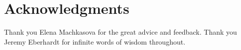 \documentclass{sig-alternate}
\begin{document}


\section*{Acknowledgments}
\label{sec:acknowledgments}


Thank you Elena Machkasova for the great advice and feedback.
Thank you Jeremy Eberhardt for infinite words of wisdom throughout.



  
\end{document}
